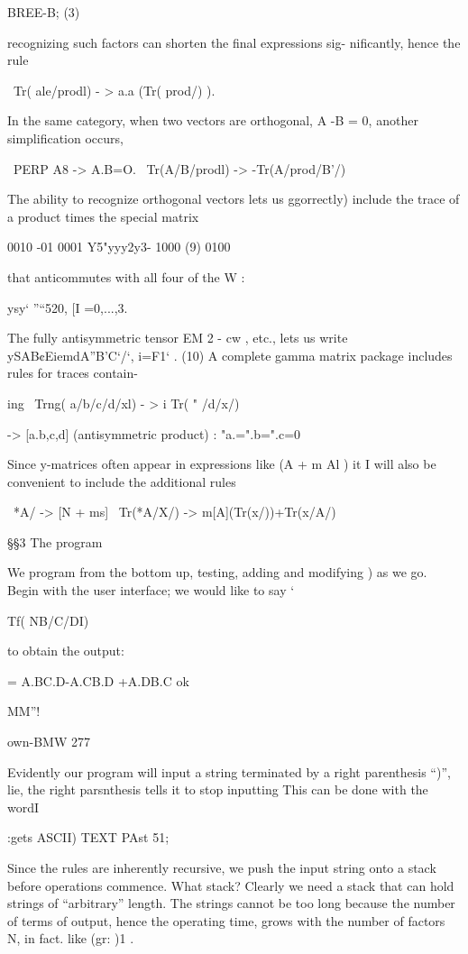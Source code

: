 BREE-B; (3)

recognizing such factors can shorten the ﬁnal expressions sig-
niﬁcantly, hence the rule

\ Tr( ale/prodl) - > a.a (Tr( prod/) ).

In the same category, when two vectors are orthogonal,
A -B = 0, another simpliﬁcation occurs,

\ PERP A8 -> A.B=O.
\ Tr(A/B/prodl) -> -Tr(A/prod/B'/)

The ability to recognize orthogonal vectors lets us ggorrectly)
include the trace of a product times the special matrix

0010
-01 0001
Y5"yyy2y3- 1000 (9)
0100

that anticommutes with all four of the W :

ysy‘ ”“520, [I =0,...,3.

The fully antisymmetric tensor EM 2 - cw , etc., lets us write
ySAB¢EiemdA”B’C‘/‘, i=F1‘ . (10)
A complete gamma matrix package includes rules for traces contain-

ing
\ Trng( a/b/c/d/xl) - > i Tr( " /d/x/)

-> [a.b,c,d] (antisymmetric product)
\Note: "a.=".b=".c=0

 

Since y-matrices often appear in expressions like (A + m Al ) it I
will also be convenient to include the additional rules

\  *A/ -> [N + ms]
\ Tr(*A/X/) -> m[A](Tr(x/))+Tr(x/A/)

§§3 The program

We program from the bottom up, testing, adding and modifying )
as we go. Begin with the user interface; we would like to say ‘

Tf( NB/C/DI)

to obtain the output:

= A.BC.D-A.CB.D +A.DB.C ok

MM”!

own-BMW 277

Evidently our program will input a string terminated by a right
parenthesis “)”, lie, the right parsnthesis tells it to stop inputting
This can be done with the wordI

:gets ASCII) TEXT PAst 51;

Since the rules are inherently recursive, we push the input string onto a stack before operations commence. What stack? Clearly we need a stack that can hold strings of “arbitrary” length. The strings cannot be too long because the number of terms of output, hence the operating time, grows with the number of factors N, in fact. like (gr: )1 .

